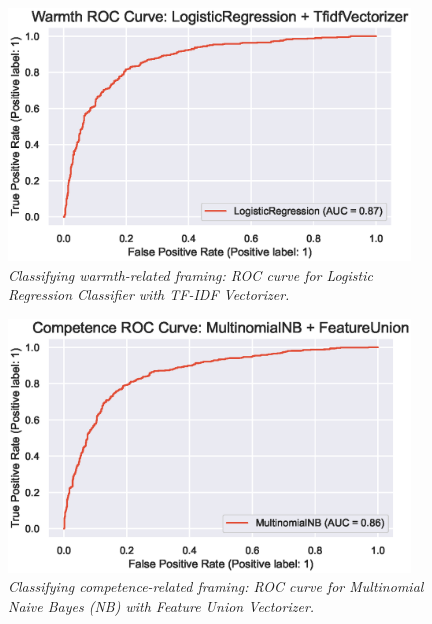 \documentclass[Royal,sageapa,times]{sagej}
\begin{document}
\begin{figure}[ht]
    \setlength{\fboxsep}{0pt}%
    \setlength{\fboxrule}{0pt}%
    \begin{center}
    \includegraphics[width=0.95\textwidth]{FT/Figure10.eps}
    \end{center}
    \caption{\textit{Classifying warmth-related framing: ROC curve for Logistic Regression Classifier with TF-IDF Vectorizer.}}
    \label{figure10}
    \end{figure}

\begin{figure}[ht]
    \setlength{\fboxsep}{0pt}%
    \setlength{\fboxrule}{0pt}%
    \begin{center}
    \includegraphics[width=0.95\textwidth]{FT/Figure11.eps}
    \end{center}
    \caption{\textit{Classifying competence-related framing: ROC curve for Multinomial Naive Bayes (NB) with Feature Union Vectorizer.}}
    \label{figure11}
    \end{figure}
\end{document}

